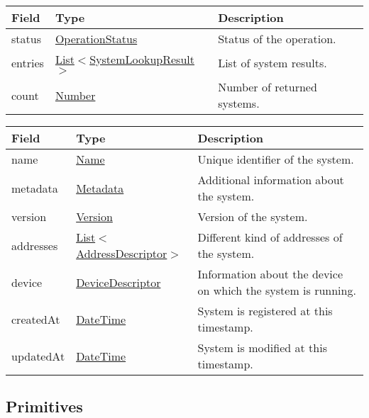 \documentclass[a4paper]{arrowhead}
\newcommand{\pref}[1]{{\textcolor{ArrowheadGrey}{\hyperref[sec:model:primitives:#1]{#1}}}}
\begin{document}
\label{sec:model:SystemLookupResponse}

\begin{table}[ht!]
\begin{tabularx}{\textwidth}{| p{3cm} | p{6cm} | X |} \hline
\rowcolor{gray!33} Field & Type      & Description \\ \hline
status & \pref{OperationStatus} & Status of the operation. \\ \hline
entries & \pref{List}$<$\hyperref[sec:model:SystemLookupResult]{SystemLookupResult}$>$     & List of system results. \\ \hline
count & \pref{Number} & Number of returned systems. \\ \hline
\end{tabularx}
\end{table}

\label{sec:model:SystemLookupResult}
 
\begin{table}[ht!]
\begin{tabularx}{\textwidth}{| p{4.25cm} | p{4cm} | X |} \hline
\rowcolor{gray!33} Field & Type      & Description \\ \hline
name & \pref{Name} & Unique identifier of the system. \\ \hline
metadata & \hyperref[sec:model:Metadata]{Metadata} & Additional information about the system. \\ \hline
version & \pref{Version} & Version of the system. \\ \hline
addresses &  \pref{List}$<$\hyperref[sec:model:AddressDescriptor]{AddressDescriptor}$>$ & Different kind of addresses of the system.  \\ \hline
device & \hyperref[sec:model:DeviceDescriptor]{DeviceDescriptor} & Information about the device on which the system is running. \\ \hline
createdAt & \pref{DateTime} & System is registered at this timestamp. \\ \hline
updatedAt & \pref{DateTime} & System is modified at this timestamp. \\ \hline
\end{tabularx}
\end{table}

\subsection{Primitives}
\label{sec:model:primitives}
\end{document}
